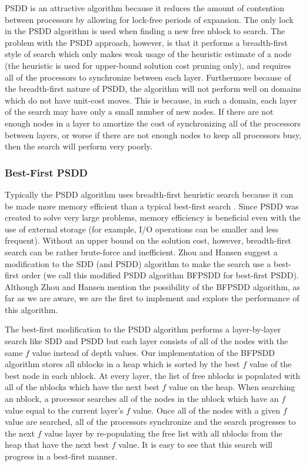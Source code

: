 \documentclass{article}
\begin{document}
 PSDD is an attractive algorithm because it reduces the amount of
 contention between processors by allowing for lock-free periods of
 expansion.  The only lock in the PSDD algorithm is used when finding a
 new free nblock to search.  The problem with the PSDD approach,
 however, is that it performs a breadth-first style of search which
 only makes weak usage of the heuristic estimate of a node (the
 heuristic is used for upper-bound solution cost pruning only), and
 requires all of the processors to synchronize between each layer.
 Furthermore because of the breadth-first nature of PSDD, the algorithm
 will not perform well on domains which do not have unit-cost moves.
 This is because, in such a domain, each layer of the search may have
 only a small number of new nodes.  If there are not enough nodes in a
 layer to amortize the cost of synchronizing all of the processors
 between layers, or worse if there are not enough nodes to keep all
 processors busy, then the search will perform very poorly.

 \subsubsection{Best-First PSDD}

 Typically the PSDD algorithm uses breadth-first heuristic search
 because it can be made more memory efficient than a typical best-first
 search \cite{zhou:bhs}.  Since PSDD was created to solve very large
 problems, memory efficiency is beneficial even with the use of
 external storage (for example, I/O operations can be smaller and less
 frequent).  Without an upper bound on the solution cost, however,
 breadth-first search can be rather brute-force and inefficient.  Zhou
 and Hansen suggest a modification to the SDD (and PSDD) algorithm to
 make the search use a best-first order \cite{zhou:sdd} (we call this
 modified PSDD algorithm BFPSDD for best-first PSDD).  Although Zhou
 and Hansen mention the possibility of the BFPSDD algorithm, as far as
 we are aware, we are the first to implement and explore the
 performance of this algorithm.

 The best-first modification to the PSDD algorithm performs a
 layer-by-layer search like SDD and PSDD but each layer consists of all
 of the nodes with the same $f$ value instead of depth values.  Our
 implementation of the BFPSDD algorithm stores all nblocks in a heap
 which is sorted by the best $f$ value of the best node in each nblock.
 At every layer, the list of free nblocks is populated with all of the
 nblocks which have the next best $f$ value on the heap.  When searching
 an nblock, a processor searches all of the nodes in the nblock which
 have an $f$ value equal to the current layer's $f$ value.  Once all of the
 nodes with a given $f$ value are searched, all of the processors
 synchronize and the search progresses to the next $f$ value layer by
 re-populating the free list with all nblocks from the heap that have
 the next best $f$ value.  It is easy to see that this search will
 progress in a best-first manner.
\end{document}

